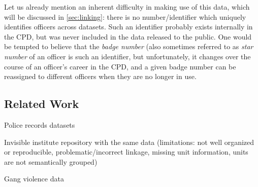 Let us already mention an inherent difficulty in making use of this data, which
will be discussed in \cref{sec:linking}: there is no number/identifier which
uniquely identifies officers across datasets. Such an identifier probably
exists internally in the CPD, but was never included in the data released to
the public. One would be tempted to believe that the \emph{badge number} (also
sometimes referred to as \emph{star number} of an officer is such an
identifier, but unfortunately, it changes over the course of an officer's
career in the CPD, and a given badge number can be reassigned to different
officers when they are no longer in use.


\subsection{Related Work}

Police records datasets

Invisible institute repository with the same data
(limitations: not well organized or reproducible, problematic/incorrect linkage, missing unit information, units are not semantically grouped)

Gang violence data


